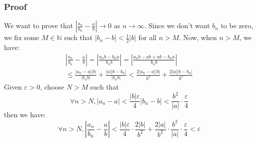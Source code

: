 \documentclass{beamer}
\begin{document}
\begin{frame}
    \frametitle{Proof}
    \hspace{1em} We want to prove that $|\frac{a_n}{b_n}-\frac{a}{b}|\rightarrow 0$ as $n\rightarrow \infty$.
    Since we don't want $b_n$ to be zero, we fix some $M\in \mathbb{N}$ such that $|b_n-b|<\frac{1}{2}|b|$ for 
    all $n>M$. Now, when $n>M$, we have:
    \begin{multline*}
        |\frac{a_n}{b_n}-\frac{a}{b}| 
    = |\frac{a_nb-b_na}{b_nb}|=|\frac{a_nb-ab+ab-b_na}{b_nb}| \\
     \leq \frac{|a_n-a||b|}{|b_nb|}+\frac{|a||b-b_n|}{|b_nb|} 
     <\frac{2|a_n-a||b|}{b^2}+\frac{2|a||b-b_n|}{b^2}
    \end{multline*}
    \hspace{1em} Given $\varepsilon >0$, choose $N>M$ such that 
\begin{equation*}
    \forall n> N, |a_n-a|<\frac{|b|\varepsilon}{4}|b_n-b|<\frac{b^2}{|a|}\cdot \frac{\varepsilon}{4}
\end{equation*} 
then we have:
\begin{equation*}
    \forall n>N, |\frac{a_n}{b_n}-\frac{a}{b}|<\frac{|b|\varepsilon}{4}\cdot\frac{2|b|}{b^2}+\frac{2|a|}{b^2}\cdot \frac{b^2}{|a|}\cdot \frac{\varepsilon}{4}<\varepsilon
\end{equation*}
\end{frame}
\end{document}
